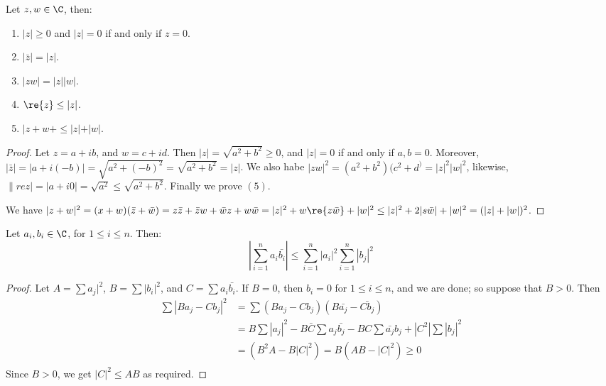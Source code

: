 \begin{theorem}\label{1.4.6}
    Let $z,w \in \C$, then:
        \begin{enumerate}[label=(\arabic*)]
            \item $|z| \geq 0$ and  $|z|=0$ if and only if $z=0$.

            \item  $|\bar{z}|=|z|$.

            \item $|zw|=|z||w|$.

            \item  $\re{z} \leq |z|$.

            \item  $|z+w+ \leq |z|+|w|$.
        \end{enumerate}
\end{theorem}
\begin{proof}
    Let $z=a+ib$, and  $w=c+id$. Then  $|z|=\sqrt{a^2+b^2} \geq 0$, and  $|z|=0$ if 
    and only if  $a,b=0$. Moreover,  $|\bar{z}|=|a+i(-b)|=\sqrt{a^2+(-b)^2}=\sqrt{a^2+b^2}=|z|$. 
    We also habe $|zw|^2=(a^2+b^2)(c^2+d^)=|z|^2|w|^2$, likewise,  $\|re{z}|=|a+i0|=
    \sqrt{a^2} \leq \sqrt{a^2+b^2}$. Finally we prove $(5)$.

    We have  $|z+w|^2=(x+w)(\bar{z}+\bar{w})=z\bar{z}+\bar{z}w+\bar{w}z+w\bar{w}= 
    |z|^2+w\re{z\bar{w}}+|w|^2 \leq |z|^2+2|s\bar{w}|+|w|^2=(|z|+|w|)^2$.
\end{proof}

\begin{theorem}\label{1.4.7}
    Let $a_i,b_i \in \C$, for  $1 \leq i \leq n$. Then:
         \begin{equation}
             |\sum_{i=1}^{n}{a_i\bar{b_i}}| \leq \sum_{i = 1}^{n}{|a_i|^2}\sum_{i=1}^{n}{|b_j|^2}		
        \end{equation}
\end{theorem}
\begin{proof}
    Let $A=\sum{a_j|^2}$,  $B=\sum{|b_i|^2}$, and $C=\sum{a_i\bar{b_i}}$. If  $B=0$, then 
     $b_i=0$ for  $1 \leq i \leq n$, and we are done; so suppose that  $B>0$. Then
        \begin{align*}
            \sum{|Ba_j-Cb_j|^2} &= \sum{(Ba_j-Cb_j)(B\bar{a_j}-\bar{Cb_j})} \\
                             &= B\sum{|a_j|^2}-B\bar{C}\sum{a_j\bar{b_j}-BC\sum{\bar{a_j}b_j}}+|C^2|\sum{|b_j|^2} \\
                             &= (B^2A-B|C|^2)=B(AB-|C|^2) \geq 0 \\
        \end{align*}
    Since $B>0$, we get  $|C|^2 \leq AB$ as required.
\end{proof}
